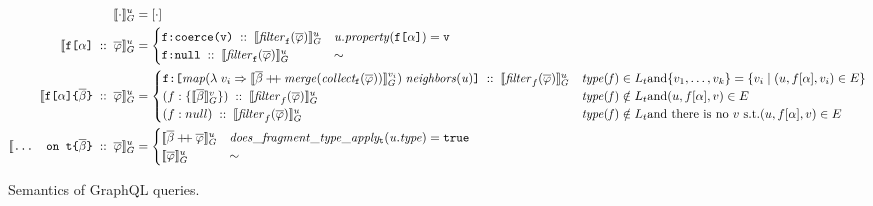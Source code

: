 \begin{figure}[h]
\small
    \centering
    \begin{align}
    \llbracket \cdot \rrbracket^{u}_{G} &= [\cdot] \\
    \llbracket \texttt{f[}\alpha\texttt{]}\; ::\; \overline{\varphi} \rrbracket^{u}_{G} &= \begin{cases}
    \texttt{f}\texttt{:}\texttt{coerce(\texttt{v})} \; ::\; \llbracket \mathit{filter}_{\texttt{f}}(\overline{\varphi}) \rrbracket^{u}_{G}  & \mathit{u.property}(\texttt{f[}\alpha\texttt{]}) = \texttt{v} \\
    \texttt{f}\texttt{:}\texttt{null} \; :: \; \llbracket \mathit{filter}_{\texttt{f}}(\overline{\varphi}) \rrbracket^{u}_{G} & \sim
    \end{cases}\\
    \llbracket \texttt{f[}\alpha\texttt{]} \texttt{\{}\overline{\beta}\texttt{\}} \; ::\; \overline{\varphi} \rrbracket^{u}_{G} &=
    \begin{cases}
    \texttt{f}\texttt{:}\texttt{[} \mathit{map} (\lambda\; v_{i} \Rightarrow \llbracket \overline{\beta} \mathbin{+\mkern-5mu+} \mathit{merge (collect_{\texttt{f}} (\overline{\varphi}))} \rrbracket^{v_{i}}_{G})\; \mathit{neighbors(u)} \texttt{]} \; :: \; \llbracket \mathit{filter}_{f}(\overline{\varphi}) \rrbracket^{u}_{G}  & \mathit{type(f)} \in L_{t} \text{and} \{v_{1}, \ldots, v_{k}\} = \{v_{i} \mid (u, f[\alpha], v_{i}) \in E\} \\
    (f:\{\llbracket \overline{\beta} \rrbracket^{v}_{G}\})\; :: \; \llbracket \mathit{filter}_{f}(\overline{\varphi}) \rrbracket^{u}_{G}  & \mathit{type(f)} \notin L_{t} \text{and} (u, f[\alpha], v) \in E \\
    (f:null)\; :: \; \llbracket \mathit{filter}_{f}(\overline{\varphi}) \rrbracket^{u}_{G} & \mathit{type(f)} \notin L_{t} \text{and there is no } v \text{ s.t.} (u, f[\alpha], v) \in E \\
    \end{cases}\\
    \llbracket \texttt{... on t}\texttt{\{}\overline{\beta}\texttt{\}}\; ::\; \overline{\varphi} \rrbracket^{u}_{G} &= \begin{cases}
    \llbracket \overline{\beta} \mathbin{+\mkern-5mu+} \overline{\varphi} \rrbracket^{u}_{G} & \mathit{does\_fragment\_type\_apply_{\texttt{t}}(u.type)} = \texttt{true}\\
    \llbracket \overline{\varphi} \rrbracket^{u}_{G} & \sim
    \end{cases}
    \end{align}
    \caption{Semantics of GraphQL queries.}
    \label{fig:semantics}
\end{figure}


